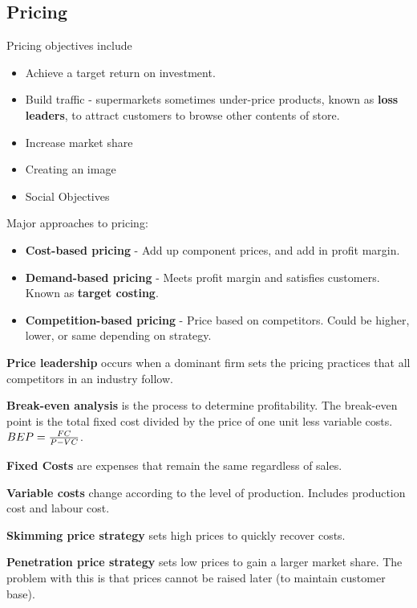 \documentclass[english, 12pt]{article}
\begin{document}
\subsection{Pricing}
Pricing objectives include
\begin{itemize}
\item Achieve a target return on investment.
\item Build traffic - supermarkets sometimes under-price products, known as \textbf{loss leaders}, to attract customers to browse other contents of store.
\item Increase market share
\item Creating an image
\item Social Objectives
\end{itemize}
Major approaches to pricing:
\begin{itemize}
\item \textbf{Cost-based pricing} - Add up component prices, and add in profit margin.
\item \textbf{Demand-based pricing} - Meets profit margin and satisfies customers. Known as \textbf{target costing}.
\item \textbf{Competition-based pricing} - Price based on competitors. Could be higher, lower, or same depending on strategy.
\end{itemize}
\begin{defn}
\textbf{Price leadership} occurs when a dominant firm sets the pricing practices that all competitors in an industry follow.
\end{defn}
\begin{defn}
\textbf{Break-even analysis} is the process to determine profitability. The break-even point is the total fixed cost divided by the price of one unit less variable costs. $BEP = \frac{FC}{P-VC}$.
\end{defn}
\begin{defn}
\textbf{Fixed Costs} are expenses that remain the same regardless of sales.
\end{defn}
\begin{defn}
\textbf{Variable costs} change according to the level of production. Includes production cost and labour cost.
\end{defn}
\begin{defn}
\textbf{Skimming price strategy} sets high prices to quickly recover costs.
\end{defn}
\begin{defn}
\textbf{Penetration price strategy} sets low prices to gain a larger market share. The problem with this is that prices cannot be raised later (to maintain customer base).
\end{defn}
\end{document}
